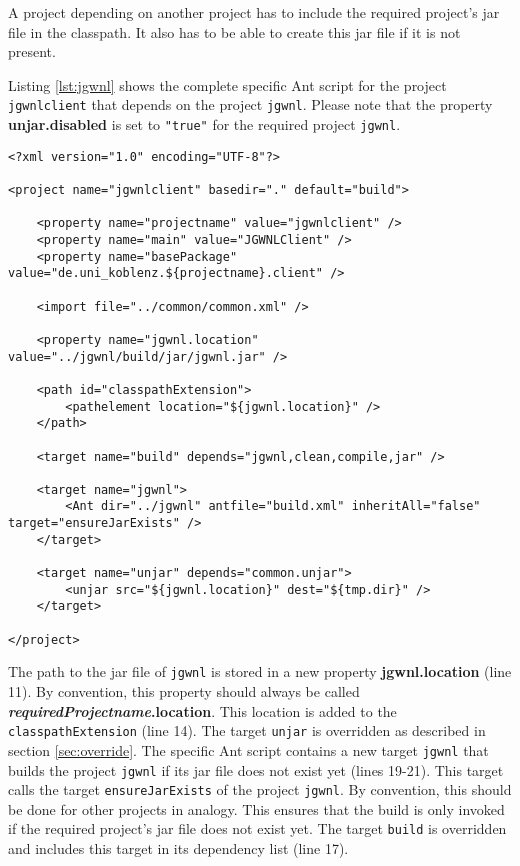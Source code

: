 \documentclass[a4paper,twoside,11pt,bibtotoc]{article}
\begin{document}
A project depending on another project has to include the required project's jar file in the classpath.
It also has to be able to create this jar file if it is not present.

Listing \ref{lst:jgwnl} shows the complete specific Ant script for the project \texttt{jgwnlclient} that depends on the project \texttt{jgwnl}.
Please note that the property \textbf{unjar.disabled} is set to \texttt{"true"} for the required project \texttt{jgwnl}.

\begin{lstlisting}[caption=specific Ant script of the project \texttt{jgwnlclient},label=lst:jgwnl,float=!ht,language=Ant]
<?xml version="1.0" encoding="UTF-8"?>

<project name="jgwnlclient" basedir="." default="build">

	<property name="projectname" value="jgwnlclient" />
	<property name="main" value="JGWNLClient" />
	<property name="basePackage" value="de.uni_koblenz.${projectname}.client" />

	<import file="../common/common.xml" />

	<property name="jgwnl.location" value="../jgwnl/build/jar/jgwnl.jar" />

	<path id="classpathExtension">
		<pathelement location="${jgwnl.location}" />
	</path>

	<target name="build" depends="jgwnl,clean,compile,jar" />

	<target name="jgwnl">
		<Ant dir="../jgwnl" antfile="build.xml" inheritAll="false" target="ensureJarExists" />
	</target>

	<target name="unjar" depends="common.unjar">
		<unjar src="${jgwnl.location}" dest="${tmp.dir}" />
	</target>

</project>
\end{lstlisting}

The path to the jar file of \texttt{jgwnl} is stored in a new property \textbf{jgwnl.location} (line 11).
By convention, this property should always be called \textbf{\textit{requiredProjectname}.location}.
This location is added to the \texttt{classpathExtension} (line 14).
The target \texttt{unjar} is overridden as described in section \ref{sec:override}.
The specific Ant script contains a new target \texttt{jgwnl} that builds the project \texttt{jgwnl} if its jar file does not exist yet (lines 19-21).
This target calls the target \texttt{ensureJarExists} of the project \texttt{jgwnl}.
By convention, this should be done for other projects in analogy.
This ensures that the build is only invoked if the required project's jar file does not exist yet.
The target \texttt{build} is overridden and includes this target in its dependency list (line 17).
\end{document}
